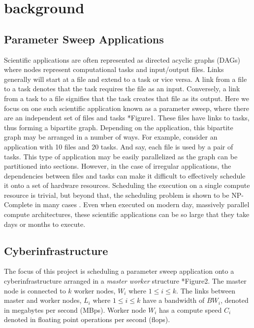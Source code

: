\section{background} \label{sec:background}

\subsection*{Parameter Sweep Applications}

Scientific applications are often represented as directed acyclic graphs (DAGs)
where nodes represent computational tasks and input/output files. Links
generally will start at a file and extend to a task or vice versa. A link from a
file to a task denotes that the task requires the file as an input. Conversely,
a link from a task to a file signifies that the task creates that file as its
output. Here we focus on one such scientific application known as a parameter
sweep, where there are an independent set of files and tasks *Figure1. These
files have links to tasks, thus forming a bipartite graph. Depending on the
application, this bipartite graph may be arranged in a number of ways. For
example, consider an application with 10 files and 20 tasks. And say, each file
is used by a pair of tasks. This type of application may be easily parallelized
as the graph can be partitioned into sections. However, in the case of irregular
applications, the dependencies between files and tasks can make it difficult to
effectively schedule it onto a set of hardware resources. Scheduling the
execution on a single compute resource is trivial, but beyond that, the
scheduling problem is shown to be NP-Complete in many cases
\cite{Giersch-task-sharing-files-04}. Even when executed on modern day,
massively parallel compute architectures, these scientific applications can be
so large that they take days or months to execute.

\subsection*{Cyberinfrastructure}

The focus of this project is scheduling a parameter sweep application onto a
cyberinfrastructure arranged in a \textit{master worker} structure *Figure2. The
master node is connected to $k$ worker nodes, $W_i$ where $1 \leq i \leq k$.
The links between master and worker nodes, $L_i$ where $1 \leq i \leq k$ have
a bandwidth of $BW_i$, denoted in megabytes per second (MBps).
Worker node $W_i$ has a compute speed $C_i$ denoted in floating point operations
per second (flops).

